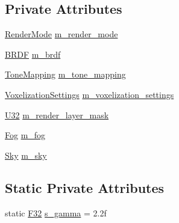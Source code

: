 \subsection*{Private Attributes}
\begin{DoxyCompactItemize}
\item 
\mbox{\hyperlink{namespacemage_1_1rendering_aeb14ce7610cc9391f4e01be027b91dcc}{Render\+Mode}} \mbox{\hyperlink{classmage_1_1rendering_1_1_camera_settings_adf563f8bd1ee5cecd126c6b4731de6e5}{m\+\_\+render\+\_\+mode}}
\item 
\mbox{\hyperlink{namespacemage_1_1rendering_ab8fe8684ca4bd74ba3a394b00cf125b5}{B\+R\+DF}} \mbox{\hyperlink{classmage_1_1rendering_1_1_camera_settings_a18daf9b9c8c7319e7db996a406aa0a43}{m\+\_\+brdf}}
\item 
\mbox{\hyperlink{namespacemage_1_1rendering_a789e4b7d9a8cc831b065e9c6bb7430e9}{Tone\+Mapping}} \mbox{\hyperlink{classmage_1_1rendering_1_1_camera_settings_a5a88df673aa475c5087bf74620048580}{m\+\_\+tone\+\_\+mapping}}
\item 
\mbox{\hyperlink{classmage_1_1rendering_1_1_voxelization_settings}{Voxelization\+Settings}} \mbox{\hyperlink{classmage_1_1rendering_1_1_camera_settings_a4d4cc0955f6bac39a57382a15fe81d64}{m\+\_\+voxelization\+\_\+settings}}
\item 
\mbox{\hyperlink{namespacemage_a41c104c036fba3756a74e19f793eeaa1}{U32}} \mbox{\hyperlink{classmage_1_1rendering_1_1_camera_settings_ab6d4995fe7531563c5c5c8db1a0a1c9f}{m\+\_\+render\+\_\+layer\+\_\+mask}}
\item 
\mbox{\hyperlink{classmage_1_1rendering_1_1_fog}{Fog}} \mbox{\hyperlink{classmage_1_1rendering_1_1_camera_settings_a173329d1022c717efe29e33eaa554d18}{m\+\_\+fog}}
\item 
\mbox{\hyperlink{classmage_1_1rendering_1_1_sky}{Sky}} \mbox{\hyperlink{classmage_1_1rendering_1_1_camera_settings_a62c726791db2c8ee20ef404e15c5f26c}{m\+\_\+sky}}
\end{DoxyCompactItemize}
\subsection*{Static Private Attributes}
\begin{DoxyCompactItemize}
\item 
static \mbox{\hyperlink{namespacemage_aa97e833b45f06d60a0a9c4fc22ae02c0}{F32}} \mbox{\hyperlink{classmage_1_1rendering_1_1_camera_settings_add0c4a63661e6cbfed40f6f3267d72d5}{s\+\_\+gamma}} = 2.\+2f
\end{DoxyCompactItemize}


